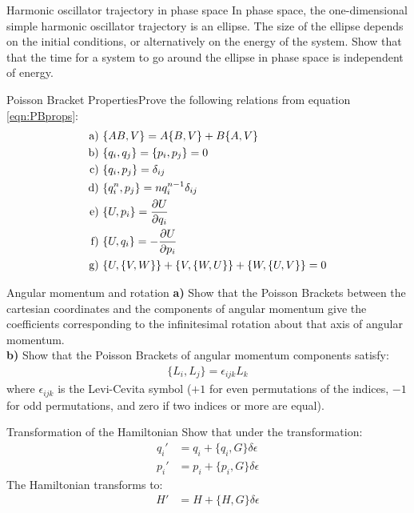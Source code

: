 \begin{problem}{Harmonic oscillator trajectory in phase space} In phase space, the one-dimensional simple harmonic oscillator trajectory is an ellipse. The size of the ellipse depends on the initial conditions, or alternatively on the energy of the system. Show that that the time for a system to go around the ellipse in phase space is independent of energy.
\label{prob_Hamilton_6}
\end{problem}

\begin{problem}{Poisson Bracket Properties}Prove the following relations from equation \ref{eqn:PBprops}:
\begin{align*}
\text{a)   }&\{AB,V\}=A\{B,V\}+B\{A,V\}\nonumber\\
\text{b)   }&\{q_i,q_j\}=\{p_i,p_j\}=0\nonumber\\
\text{c)   }&\{q_i,p_j\}=\delta_{ij}\nonumber\\
\text{d)   }&\{q_i^n,p_j\}=nq_i^{n-1}\delta_{ij}\nonumber\\
\text{e)   }&\{U,p_i\}=\frac{\partial U}{\partial q_i}\nonumber\\
\text{f)   }&\{U,q_i\}=-\frac{\partial U}{\partial p_i}\nonumber\\
\text{g)   }&\{U,\{V,W\}\}+\{V,\{W,U\}\}+\{W,\{U,V\}\}=0
\end{align*}
\label{prob_Hamilton_7}
\end{problem}

\begin{problem}{Angular momentum and rotation}
\textbf{a)} Show that the Poisson Brackets between the cartesian coordinates and the components of angular momentum give the coefficients corresponding to the infinitesimal rotation about that axis of angular momentum.\\
\textbf{b)} Show that the Poisson Brackets of angular momentum components satisfy:
\begin{align*}
\{L_i,L_j\}=\epsilon_{ijk}L_k
\end{align*}
where $\epsilon_{ijk}$ is the Levi-Cevita symbol ($+1$ for even permutations of the indices, $-1$ for odd permutations, and zero if two indices or more are equal).
\label{prob_Hamilton_8}
\end{problem}

\begin{problem}{Transformation of the Hamiltonian}
Show that under the transformation:
\begin{align*}
q_i'&=q_i+\{q_i,G\}\delta\epsilon\nonumber\\
p_i'&=p_i+\{p_i,G\}\delta\epsilon
\end{align*}
The Hamiltonian transforms to:
\begin{align*}
H'&=H+\{H,G\}\delta\epsilon
\end{align*}
\label{prob_Hamilton_9}
\end{problem}

